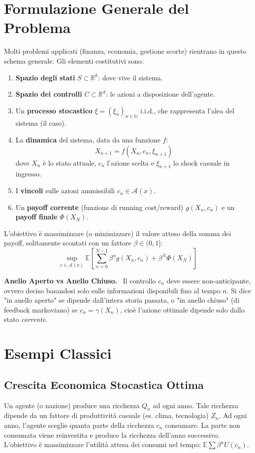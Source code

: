 \documentclass[11pt, a4paper]{report}
\theoremstyle{plain}
\theoremstyle{definition}
\theoremstyle{remark}
\newenvironment{spiegazione}[1][Spiegazione]
{\begin{mdframed}[backgroundcolor=green!5, linecolor=green!50, linewidth=2pt, topline=false, rightline=false, bottomline=false]
\textbf{\textsf{#1.}}\ }
{\end{mdframed}}
\newcommand{\E}{\mathbb{E}}
\newcommand{\R}{\mathbb{R}}
\newcommand{\N}{\mathbb{N}}
\newcommand{\1}{\mathbf{1}}
\begin{document}
\section{Formulazione Generale del Problema}

Molti problemi applicati (finanza, economia, gestione scorte) rientrano in questo schema generale.
Gli elementi costitutivi sono:
\begin{enumerate}
    \item \textbf{Spazio degli stati} $S \subset \R^k$: dove vive il sistema.
    \item \textbf{Spazio dei controlli} $C \subset \R^d$: le azioni a disposizione dell'agente.
    \item Un \textbf{processo stocastico} $\xi = (\xi_n)_{n \in \N}$ i.i.d., che rappresenta l'alea del sistema (il caso).
    \item La \textbf{dinamica} del sistema, data da una funzione $f$:
    \[ X_{n+1} = f(X_n, c_n, \xi_{n+1}) \]
    dove $X_n$ è lo stato attuale, $c_n$ l'azione scelta e $\xi_{n+1}$ lo shock casuale in ingresso.
    \item I \textbf{vincoli} sulle azioni ammissibili $c_n \in \mathcal{A}(x)$.
    \item Un \textbf{payoff corrente} (funzione di running cost/reward) $g(X_n, c_n)$ e un \textbf{payoff finale} $\Phi(X_N)$.
\end{enumerate}

L'obiettivo è massimizzare (o minimizzare) il valore atteso della somma dei payoff, solitamente scontati con un fattore $\beta \in (0, 1]$:
\[ \sup_{c \in \mathcal{A}(x)} \E \left[ \sum_{n=0}^{N-1} \beta^n g(X_n, c_n) + \beta^N \Phi(X_N) \right] \]

\begin{spiegazione}[Anello Aperto vs Anello Chiuso]
Il controllo $c_n$ deve essere non-anticipante, ovvero deciso basandosi solo sulle informazioni disponibili fino al tempo $n$. 
Si dice "in anello aperto" se dipende dall'intera storia passata, o "in anello chiuso" (di feedback markoviano) se $c_n = \gamma(X_n)$, cioè l'azione ottimale dipende solo dallo stato \emph{corrente}.
\end{spiegazione}

\section{Esempi Classici}

\subsection{Crescita Economica Stocastica Ottima}
Un agente (o nazione) produce una ricchezza $Q_n$ ad ogni anno. Tale ricchezza dipende da un fattore di produttività casuale (es. clima, tecnologia) $Z_n$. Ad ogni anno, l'agente sceglie quanta parte della ricchezza $c_n$ consumare. La parte non consumata viene reinvestita e produce la ricchezza dell'anno successivo. L'obiettivo è massimizzare l'utilità attesa dei consumi nel tempo: $\E \sum \beta^n U(c_n)$.
\end{document}
